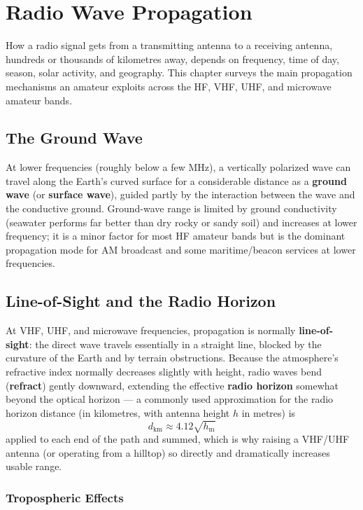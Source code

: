\chapter{Radio Wave Propagation}
\label{ch:propagation}

How a radio signal gets from a transmitting antenna to a receiving
antenna, hundreds or thousands of kilometres away, depends on frequency,
time of day, season, solar activity, and geography. This chapter surveys
the main propagation mechanisms an amateur exploits across the HF, VHF,
UHF, and microwave amateur bands.

\section{The Ground Wave}

At lower frequencies (roughly below a few MHz), a vertically polarized
wave can travel along the Earth's curved surface for a considerable
distance as a \textbf{ground wave} (or \textbf{surface wave}), guided
partly by the interaction between the wave and the conductive ground.
Ground-wave range is limited by ground conductivity (seawater performs
far better than dry rocky or sandy soil) and increases at lower
frequency; it is a minor factor for most HF amateur bands but is the
dominant propagation mode for AM broadcast and some maritime/beacon
services at lower frequencies.

\section{Line-of-Sight and the Radio Horizon}

At VHF, UHF, and microwave frequencies, propagation is normally
\textbf{line-of-sight}: the direct wave travels essentially in a
straight line, blocked by the curvature of the Earth and by terrain
obstructions. Because the atmosphere's refractive index normally
decreases slightly with height, radio waves bend (\textbf{refract})
gently downward, extending the effective \textbf{radio horizon} somewhat
beyond the optical horizon --- a commonly used approximation for the
radio horizon distance (in kilometres, with antenna height $h$ in
metres) is
\[
d_{\text{km}} \approx 4.12\sqrt{h_{\text{m}}}
\]
applied to each end of the path and summed, which is why raising a
VHF/UHF antenna (or operating from a hilltop) so directly and
dramatically increases usable range.

\subsection{Tropospheric Effects}

